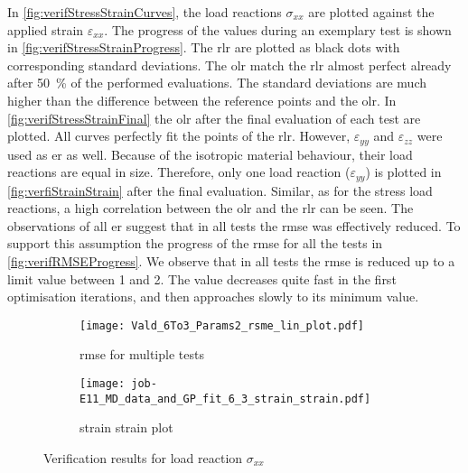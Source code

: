 In \autoref{fig:verifStressStrainCurves}, the load reactions $\sigma_{xx}$ are plotted against the applied strain $\varepsilon_{xx}$. The progress of the values during an exemplary test is shown in \autoref{fig:verifStressStrainProgress}. The \acrlong{rlr} are plotted as black dots with corresponding standard deviations. The \acrlong{olr} match the \acrlong{rlr} almost perfect already after 50 \% of the performed evaluations. The standard deviations are much higher than the difference between the reference points and the \acrlong{olr}. In \autoref{fig:verifStressStrainFinal} the \acrlong{olr} after the final evaluation of each test are plotted. All curves perfectly fit the points of the \acrlong{rlr}. However, $\varepsilon_{yy}$ and $\varepsilon_{zz}$ were used as \acrlong{er} as well. Because of the isotropic material behaviour, their load reactions are equal in size. Therefore, only one load reaction ($\varepsilon_{yy}$) is plotted in \autoref{fig:verfiStrainStrain} after the final evaluation. Similar, as for the stress load reactions, a high correlation between the \acrlong{olr} and the \acrlong{rlr} can be seen. The observations of all \acrlong{er} suggest that in all tests the \acrshort{rmse} was effectively reduced. To support this assumption the progress of the \acrshort{rmse} for all the tests in \autoref{fig:verifRMSEProgress}. We observe that in all tests the \acrshort{rmse} is reduced up to a limit value between 1 and 2. The value decreases quite fast in the first optimisation iterations, and then approaches slowly to its minimum value.

\begin{figure}[H]
\centering
\begin{subfigure}[t]{0.495\textwidth}
    \centering
    \texttt{[image: Vald\_6To3\_Params2\_rsme\_lin\_plot.pdf]}
    \caption{rmse for multiple tests}
    \label{fig:verifRMSEProgress}
\end{subfigure}
\hfill
\begin{subfigure}[t]{0.495\textwidth}
    \centering
    \centering
    \texttt{[image: job-E11\_MD\_data\_and\_GP\_fit\_6\_3\_strain\_strain.pdf]}
    \caption{strain strain plot}
    \label{fig:verfiStrainStrain}
\end{subfigure}
\caption{Verification results for load reaction $\sigma_{xx}$}
\label{fig:voceAndRMSEVerif}
\end{figure}

